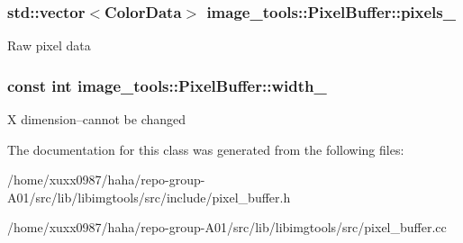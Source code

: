 \subsubsection[{\texorpdfstring{pixels\+\_\+}{pixels_}}]{\setlength{\rightskip}{0pt plus 5cm}std\+::vector$<${\bf Color\+Data}$>$ image\+\_\+tools\+::\+Pixel\+Buffer\+::pixels\+\_\+\hspace{0.3cm}{\ttfamily [private]}}\hypertarget{classimage__tools_1_1PixelBuffer_a0c52483e7e29f111acf98474105f2409}{}\label{classimage__tools_1_1PixelBuffer_a0c52483e7e29f111acf98474105f2409}
Raw pixel data 
\subsubsection[{\texorpdfstring{width\+\_\+}{width_}}]{\setlength{\rightskip}{0pt plus 5cm}const int image\+\_\+tools\+::\+Pixel\+Buffer\+::width\+\_\+\hspace{0.3cm}{\ttfamily [private]}}\hypertarget{classimage__tools_1_1PixelBuffer_ac67206a6b428c7b33bd7f90f65b8c171}{}\label{classimage__tools_1_1PixelBuffer_ac67206a6b428c7b33bd7f90f65b8c171}
X dimension--cannot be changed 

The documentation for this class was generated from the following files\+:\begin{DoxyCompactItemize}
\item 
/home/xuxx0987/haha/repo-\/group-\/\+A01/src/lib/libimgtools/src/include/pixel\+\_\+buffer.\+h\item 
/home/xuxx0987/haha/repo-\/group-\/\+A01/src/lib/libimgtools/src/pixel\+\_\+buffer.\+cc\end{DoxyCompactItemize}
